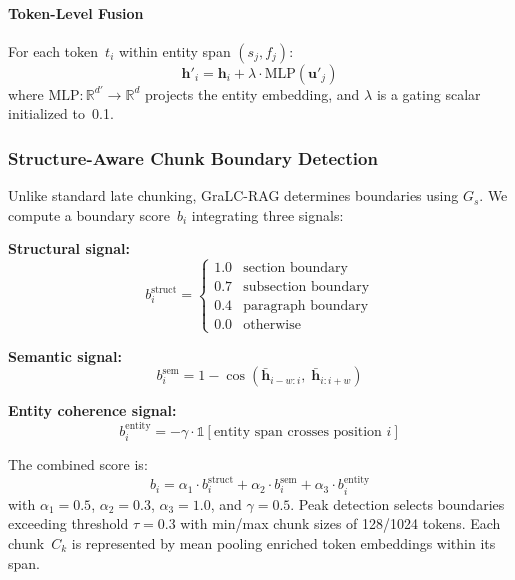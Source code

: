 \documentclass[sn-basic]{sn-jnl}
\newcommand{\gralcrag}{GraLC-RAG}
\begin{document}
\paragraph{Token-Level Fusion}
For each token~$t_i$ within entity span $(s_j, f_j)$:
\begin{equation}
  \mathbf{h}'_i = \mathbf{h}_i + \lambda \cdot \text{MLP}(\mathbf{u}'_j)
\end{equation}
where $\text{MLP}\!: \mathbb{R}^{d'} \!\to\! \mathbb{R}^{d}$ projects the entity embedding, and $\lambda$ is a gating scalar initialized to~0.1.

\subsubsection{Structure-Aware Chunk Boundary Detection}\label{sec:boundaries}

Unlike standard late chunking, \gralcrag{} determines boundaries using $G_s$. We compute a boundary score~$b_i$ integrating three signals:

\textbf{Structural signal:}
\begin{equation}
  b_i^{\text{struct}} = \begin{cases}
    1.0 & \text{section boundary} \\
    0.7 & \text{subsection boundary} \\
    0.4 & \text{paragraph boundary} \\
    0.0 & \text{otherwise}
  \end{cases}
\end{equation}

\textbf{Semantic signal:}
\begin{equation}
  b_i^{\text{sem}} = 1 - \cos(\bar{\mathbf{h}}_{i-w:i},\; \bar{\mathbf{h}}_{i:i+w})
\end{equation}

\textbf{Entity coherence signal:}
\begin{equation}
  b_i^{\text{entity}} = -\gamma \cdot \mathbb{1}[\text{entity span crosses position } i]
\end{equation}

The combined score is:
\begin{equation}
  b_i = \alpha_1 \cdot b_i^{\text{struct}} + \alpha_2 \cdot b_i^{\text{sem}} + \alpha_3 \cdot b_i^{\text{entity}}
\end{equation}
with $\alpha_1\!=\!0.5$, $\alpha_2\!=\!0.3$, $\alpha_3\!=\!1.0$, and $\gamma\!=\!0.5$. Peak detection selects boundaries exceeding threshold $\tau\!=\!0.3$ with min/max chunk sizes of 128/1024 tokens. Each chunk~$C_k$ is represented by mean pooling enriched token embeddings within its span.
\end{document}
